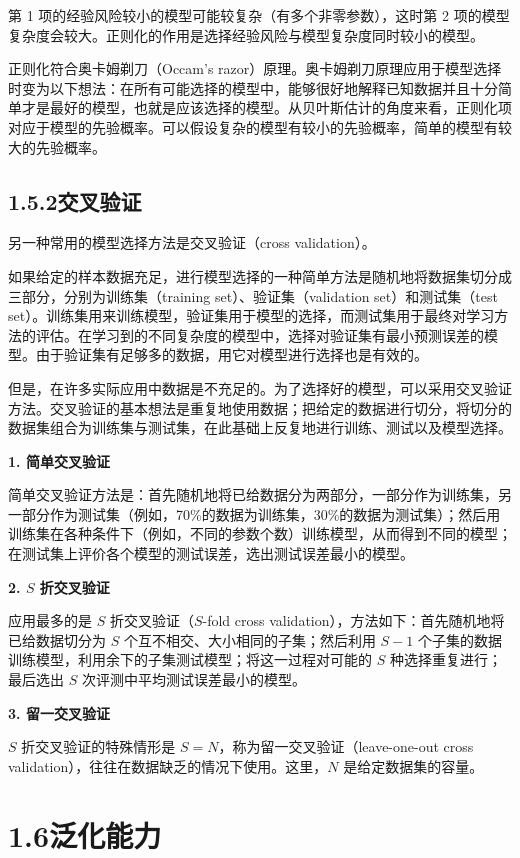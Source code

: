 \documentclass[UTF8,12pt,a4paper,fontset=fandol]{ctexart}
\begin{document}
第 1 项的经验风险较小的模型可能较复杂（有多个非零参数），这时第 2 项的模型复杂度会较大。正则化的作用是选择经验风险与模型复杂度同时较小的模型。

正则化符合奥卡姆剃刀（Occam's razor）原理。奥卡姆剃刀原理应用于模型选择时变为以下想法：在所有可能选择的模型中，能够很好地解释已知数据并且十分简单才是最好的模型，也就是应该选择的模型。从贝叶斯估计的角度来看，正则化项对应于模型的先验概率。可以假设复杂的模型有较小的先验概率，简单的模型有较大的先验概率。

\subsection*{1.5.2\quad 交叉验证}

另一种常用的模型选择方法是交叉验证（cross validation）。

如果给定的样本数据充足，进行模型选择的一种简单方法是随机地将数据集切分成三部分，分别为训练集（training set）、验证集（validation set）和测试集（test set）。训练集用来训练模型，验证集用于模型的选择，而测试集用于最终对学习方法的评估。在学习到的不同复杂度的模型中，选择对验证集有最小预测误差的模型。由于验证集有足够多的数据，用它对模型进行选择也是有效的。

但是，在许多实际应用中数据是不充足的。为了选择好的模型，可以采用交叉验证方法。交叉验证的基本想法是重复地使用数据；把给定的数据进行切分，将切分的数据集组合为训练集与测试集，在此基础上反复地进行训练、测试以及模型选择。

\noindent\textbf{1. 简单交叉验证}

简单交叉验证方法是：首先随机地将已给数据分为两部分，一部分作为训练集，另一部分作为测试集（例如，70\%的数据为训练集，30\%的数据为测试集）；然后用训练集在各种条件下（例如，不同的参数个数）训练模型，从而得到不同的模型；在测试集上评价各个模型的测试误差，选出测试误差最小的模型。

\noindent\textbf{2. $S$ 折交叉验证}

应用最多的是 $S$ 折交叉验证（$S$-fold cross validation），方法如下：首先随机地将已给数据切分为 $S$ 个互不相交、大小相同的子集；然后利用 $S-1$ 个子集的数据训练模型，利用余下的子集测试模型；将这一过程对可能的 $S$ 种选择重复进行；最后选出 $S$ 次评测中平均测试误差最小的模型。

\noindent\textbf{3. 留一交叉验证}

$S$ 折交叉验证的特殊情形是 $S=N$，称为留一交叉验证（leave-one-out cross validation），往往在数据缺乏的情况下使用。这里，$N$ 是给定数据集的容量。

\section*{1.6\quad 泛化能力}
\end{document}
